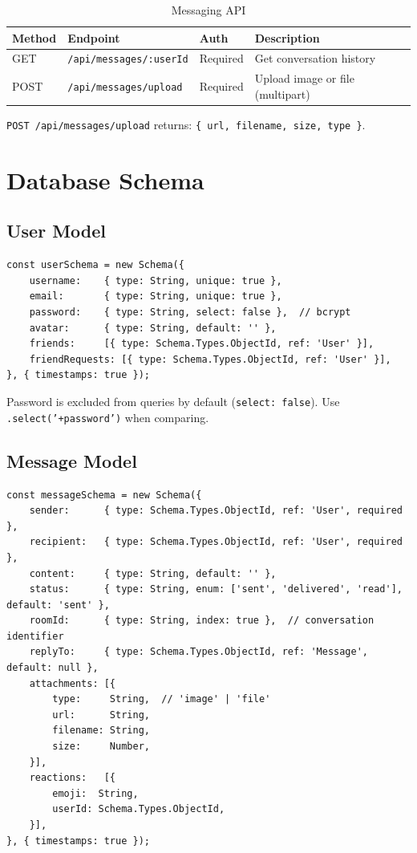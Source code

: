 \documentclass[12pt,a4paper]{article}
\newcommand{\code}[1]{\texttt{#1}}
\begin{document}
\begin{table}[H]
    \centering
    \caption{Messaging API}
    \begin{tabular}{lllp{5.5cm}}
        \toprule
        \textbf{Method} & \textbf{Endpoint}          & \textbf{Auth} & \textbf{Description} \\
        \midrule
        GET  & \code{/api/messages/:userId} & Required & Get conversation history \\
        POST & \code{/api/messages/upload}   & Required & Upload image or file (multipart) \\
        \bottomrule
    \end{tabular}
\end{table}

\code{POST /api/messages/upload} returns:
\code{\{ url, filename, size, type \}}.

\section{Database Schema}
\label{sec:database}

\subsection{User Model}
\label{sec:user-schema}

\begin{lstlisting}[style=js]
const userSchema = new Schema({
    username:    { type: String, unique: true },
    email:       { type: String, unique: true },
    password:    { type: String, select: false },  // bcrypt
    avatar:      { type: String, default: '' },
    friends:     [{ type: Schema.Types.ObjectId, ref: 'User' }],
    friendRequests: [{ type: Schema.Types.ObjectId, ref: 'User' }],
}, { timestamps: true });
\end{lstlisting}

Password is excluded from queries by default (\code{select: false}).
Use \code{.select('+password')} when comparing.

\subsection{Message Model}
\label{sec:message-schema}

\begin{lstlisting}[style=js]
const messageSchema = new Schema({
    sender:      { type: Schema.Types.ObjectId, ref: 'User', required },
    recipient:   { type: Schema.Types.ObjectId, ref: 'User', required },
    content:     { type: String, default: '' },
    status:      { type: String, enum: ['sent', 'delivered', 'read'], default: 'sent' },
    roomId:      { type: String, index: true },  // conversation identifier
    replyTo:     { type: Schema.Types.ObjectId, ref: 'Message', default: null },
    attachments: [{
        type:     String,  // 'image' | 'file'
        url:      String,
        filename: String,
        size:     Number,
    }],
    reactions:   [{
        emoji:  String,
        userId: Schema.Types.ObjectId,
    }],
}, { timestamps: true });
\end{lstlisting}
\end{document}
